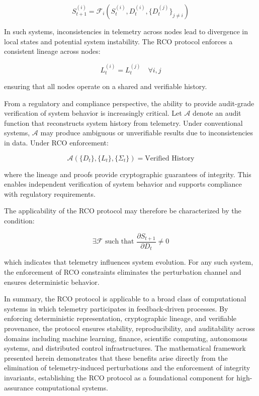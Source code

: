 \begin{equation}
S_{t+1}^{(i)} = \mathcal{F}_i(S_t^{(i)}, D_t^{(i)}, \{D_t^{(j)}\}_{j \neq i})
\end{equation}

In such systems, inconsistencies in telemetry across nodes lead to divergence in local states and potential system instability. The RCO protocol enforces a consistent lineage across nodes:

\begin{equation}
L_t^{(i)} = L_t^{(j)} \quad \forall i,j
\end{equation}

ensuring that all nodes operate on a shared and verifiable history.

From a regulatory and compliance perspective, the ability to provide audit-grade verification of system behavior is increasingly critical. Let $\mathcal{A}$ denote an audit function that reconstructs system history from telemetry. Under conventional systems, $\mathcal{A}$ may produce ambiguous or unverifiable results due to inconsistencies in data. Under RCO enforcement:

\begin{equation}
\mathcal{A}(\{D_t\}, \{L_t\}, \{\Sigma_t\}) = \text{Verified History}
\end{equation}

where the lineage and proofs provide cryptographic guarantees of integrity. This enables independent verification of system behavior and supports compliance with regulatory requirements.

The applicability of the RCO protocol may therefore be characterized by the condition:

\begin{equation}
\exists \mathcal{F} \text{ such that } \frac{\partial S_{t+1}}{\partial D_t} \neq 0
\end{equation}

which indicates that telemetry influences system evolution. For any such system, the enforcement of RCO constraints eliminates the perturbation channel and ensures deterministic behavior.

In summary, the RCO protocol is applicable to a broad class of computational systems in which telemetry participates in feedback-driven processes. By enforcing deterministic representation, cryptographic lineage, and verifiable provenance, the protocol ensures stability, reproducibility, and auditability across domains including machine learning, finance, scientific computing, autonomous systems, and distributed control infrastructures. The mathematical framework presented herein demonstrates that these benefits arise directly from the elimination of telemetry-induced perturbations and the enforcement of integrity invariants, establishing the RCO protocol as a foundational component for high-assurance computational systems.

